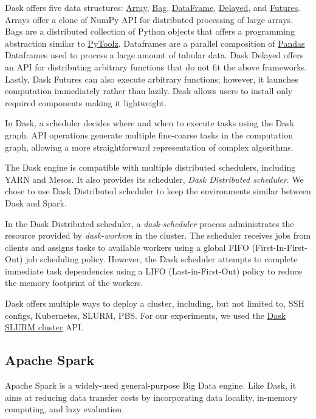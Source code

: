 \documentclass[AMA,STIX1COL]{WileyNJD-v2}
\begin{document}
Dask offers five data structures:
\href{https://docs.dask.org/en/latest/array.html}{Array},
\href{https://docs.dask.org/en/latest/bag.html}{Bag},
\href{https://docs.dask.org/en/latest/dataframe.html}{DataFrame},
\href{https://docs.dask.org/en/latest/delayed.html}{Delayed},
and \href{https://docs.dask.org/en/latest/futures.html}{Futures}.
Arrays offer a clone of NumPy API for distributed processing of large arrays.
Bags are a distributed collection of Python objects that offers a programming abstraction similar to \href{https://toolz.readthedocs.io/en/latest/}{PyToolz}.
Dataframes are a parallel composition of \href{https://pandas.pydata.org/}{Pandas} Dataframes used to process a large amount of tabular data.
Dask Delayed offers an API for distributing arbitrary functions that do not fit the above frameworks.
Lastly, Dask Futures can also execute arbitrary functions; however, it launches computation immediately rather than lazily.
Dask allows users to install only required components making it lightweight.
				
In Dask, a scheduler decides where and when to execute tasks using the Dask graph.
API operations generate multiple fine-coarse tasks in the computation graph, allowing a more straightforward representation of complex algorithms.
				
The Dask engine is compatible with multiple distributed schedulers, including YARN and Mesos.
It also provides its scheduler, \textit{Dask Distributed scheduler}.
We chose to use Dask Distributed scheduler to keep the environments similar between Dask and Spark.
				
In the Dask Distributed scheduler, a \textit{dask-scheduler} process administrates the resource provided by \textit{dask-worker}s in the cluster.
The scheduler receives jobs from clients and assigns tasks to available workers using a global FIFO (First-In-First-Out) job scheduling policy.
However, the Dask scheduler attempts to complete immediate task dependencies using a LIFO (Last-in-First-Out) policy to reduce the memory footprint of the workers.
				
Dask offers multiple ways to deploy a cluster, including, but not limited to, SSH configs, Kubernetes, SLURM, PBS.
For our experiments, we used the \href{https://jobqueue.dask.org/en/latest/generated/dask_jobqueue.SLURMCluster.html}{Dask SLURM cluster} API.
				
\subsection{Apache Spark}
Apache Spark is a widely-used general-purpose Big Data engine.
Like Dask, it aims at reducing data transfer costs by incorporating data locality, in-memory computing, and lazy evaluation.
				
\end{document}
